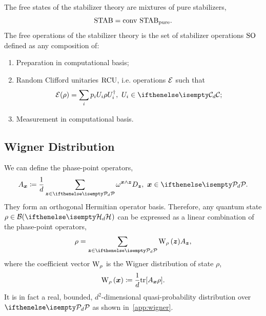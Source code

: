 \documentclass[pra,
aps,
twocolumn,
superscriptaddress,
groupedaddress,
nofootinbib,
reprint
]{revtex4-1}
\begin{document}
The free states of the stabilizer theory are mixtures of pure stabilizers, 
\begin{equation}
    \stab = \conv\ \stab_{{\rm{pure}}}.
\end{equation}
The free operations of the stabilizer theory is the set of stabilizer operations ${\rm{SO}}$ defined as any composition of:
\begin{enumerate}
    \item Preparation in computational basis;
    \item Random Clifford unitaries ${\rm{RCU}}$, i.e. operations $\mathcal{E}$ such that 
    \begin{equation}
        \E(\rho) = \sum_i p_i U_i \rho U_i^\dagger,\ U_i \in \cd;
\end{equation}
    \item Measurement in computational basis.
\end{enumerate}

\subsection{Wigner Distribution}\label{sec:wigner}

We can define the phase-point operators,
\begin{align}
	A_{\bmx} \coloneqq \frac{1}{d} \sum_{\bmz \in \pd} \omega^{\bmx \wedge \bmz} D_{\bmz},\ \bmx \in \pd. \label{eq:ax}
\end{align}
 They form an orthogonal Hermitian operator basis.
Therefore, any quantum state $\rho \in \cal{B}(\hd)$ can be expressed as a linear combination of the phase-point operators,
\begin{equation}
    \rho = \sum_{\bmz \in \pd} \W[\bmz]{\rho} A_{\bmz},
\end{equation}
where the coefficient vector $\W{\rho}$ is the Wigner distribution of state $\rho$,
\begin{equation}\label{eq:wstate}
    \W[\bmx]{\rho} \coloneqq \frac{1}{d}\tr[A_{\bmx} \rho].
\end{equation}
It is in fact a real, bounded, $d^2$-dimensional quasi-probability distribution over $\pd$ as shown in~\cref{app:wigner}. 
\end{document}
